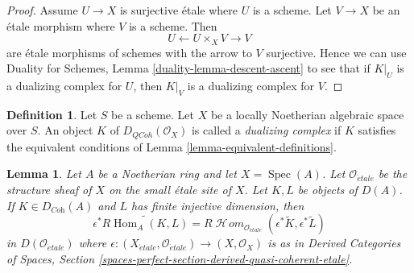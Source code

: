 \documentclass{stacks-project}
\theoremstyle{plain}
\newtheorem{lemma}[subsection]{Lemma}
\theoremstyle{definition}
\newtheorem{definition}[subsection]{Definition}
\theoremstyle{remark}
\numberwithin{equation}{subsection}
\def\Spec{\mathop{\mathrm{Spec}}}
\def\Hom{\mathop{\mathrm{Hom}}\nolimits}
\def\SheafHom{\mathop{\mathcal{H}\!\mathit{om}}\nolimits}
\def\etale{{\acute{e}tale}}
\def\QCoh{\mathit{QCoh}}
\begin{document}
\begin{proof}
Assume $U \to X$ is surjective \'etale where $U$ is a scheme.
Let $V \to X$ be an \'etale morphism where $V$ is a scheme.
Then
$$
U \leftarrow U \times_X V \rightarrow V
$$
are \'etale morphisms of schemes with the arrow to $V$ surjective.
Hence we can use Duality for Schemes, Lemma \ref{duality-lemma-descent-ascent}
to see that if $K|_U$ is a dualizing complex for $U$, then
$K|_V$ is a dualizing complex for $V$.
\end{proof}

\begin{definition}
\label{definition-dualizing-scheme}
Let $S$ be a scheme.
Let $X$ be a locally Noetherian algebraic space over $S$.
An object $K$ of $D_\QCoh(\mathcal{O}_X)$ is called a
{\it dualizing complex} if $K$ satisfies the equivalent conditions of
Lemma \ref{lemma-equivalent-definitions}.
\end{definition}

\begin{lemma}
\label{lemma-affine-duality}
Let $A$ be a Noetherian ring and let $X = \Spec(A)$. Let
$\mathcal{O}_\etale$ be the structure sheaf of $X$ on the
small \'etale site of $X$. Let $K, L$ be objects of $D(A)$.
If $K \in D_{\textit{Coh}}(A)$ and $L$ has finite injective
dimension, then
$$
\epsilon^*\widetilde{R\Hom_A(K, L)} =
R\SheafHom_{\mathcal{O}_\etale}(\epsilon^*\widetilde{K},
\epsilon^*\widetilde{L})
$$
in $D(\mathcal{O}_\etale)$ where
$\epsilon : (X_\etale, \mathcal{O}_\etale) \to (X, \mathcal{O}_X)$
is as in Derived Categories of Spaces, Section
\ref{spaces-perfect-section-derived-quasi-coherent-etale}.
\end{lemma}
\end{document}
